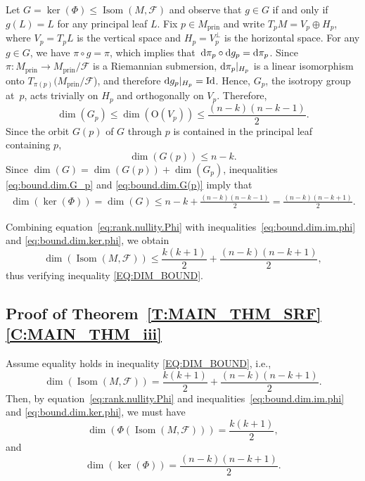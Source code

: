 \documentclass[10pt,a4paper]{amsart}
\numberwithin{equation}{section}
\theoremstyle{definition}
\DeclareMathOperator{\Iso}{Isom}
\newcommand{\prin}{\mathrm{prin}}
\newcommand{\fol}{\mathcal{F}}
\begin{document}
Let $G = \ker(\Phi)\leq \Iso(M,\fol)$ and observe that $g\in G$ if and only if $g(L) = L$ for any principal leaf $L$.
Fix $p\in M_\prin$ and write $T_pM = V_p\oplus H_p$, where $V_p=T_pL$ is the vertical space and $H_p = V_p^\perp$ is the horizontal space.
For any $g\in G$, we have $\pi\circ g = \pi$, which implies that~${{\rm d}\pi_p\circ {\rm d}g_p = {\rm d}\pi_p}$.
Since $\pi\colon M_\prin\to M_\prin/\fol$ is a Riemannian submersion, ${\rm d}\pi_p|_{H_p}$ is a linear isomorphism onto $T_{\pi(p)}(M_\prin/\fol$), and therefore ${\rm d}g_p|_{H_p}=\mathrm{Id}$. Hence, $G_p$, the isotropy group at~$p$, acts trivially on $H_p$ and orthogonally on $V_p$.
Therefore,
\begin{equation}
\label{eq:bound.dim.G_p}
\dim(G_p)\leq \dim(\mathrm{O}(V_p)) \leq \frac{(n-k)(n-k-1)}{2}.
\end{equation}
Since the orbit $G(p)$ of $G$ through $p$ is contained in the principal leaf containing $p$,
\begin{equation}
\label{eq:bound.dim.G(p)}
\dim(G(p))\leq n-k.
\end{equation}
Since $\dim(G) = \dim(G(p)) + \dim(G_p)$, inequalities \eqref{eq:bound.dim.G_p} and \eqref{eq:bound.dim.G(p)} imply that
 \begin{align}
 \label{eq:bound.dim.ker.phi}
 \dim(\ker (\Phi)) = \dim(G)
 \leq n-k +\frac{(n-k)(n-k-1)}{2} = \frac{(n-k)(n-k+1)}{2}.
 \end{align}

Combining equation~\eqref{eq:rank.nullity.Phi} with inequalities~\eqref{eq:bound.dim.im.phi} and \eqref{eq:bound.dim.ker.phi}, we obtain
\begin{equation}
\label{eq:bound.dim.Iso(M,F)}
\dim(\Iso(M,\fol)) \leq \frac{k(k+1)}{2} + \frac{(n-k)(n-k+1)}{2},
\end{equation}
thus verifying inequality \eqref{EQ:DIM_BOUND}.



\subsection[Proof of Theorem A (iii)]{Proof of Theorem~\ref{T:MAIN_THM_SRF}\,\ref{C:MAIN_THM_iii}}


Assume equality holds in inequality \eqref{EQ:DIM_BOUND}, i.e.,
\[
\dim(\Iso(M,\fol)) = \frac{k(k+1)}{2} + \frac{(n-k)(n-k+1)}{2}.
\]
Then, by equation~\eqref{eq:rank.nullity.Phi} and inequalities~\eqref{eq:bound.dim.im.phi} and \eqref{eq:bound.dim.ker.phi},
we must have
\begin{equation}
\label{eq:equality.dim.im.Phi}
\dim(\Phi(\Iso(M,\fol))) = \frac{k(k+1)}{2},
\end{equation}
and
\begin{equation}
\label{eq:equality.dim.ker.Phi}
\dim(\ker (\Phi))=\frac{(n-k)(n-k+1)}{2}.
\end{equation}
\end{document}
